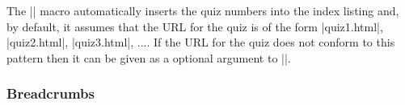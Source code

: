 \documentclass[svgnames]{article}
\begin{document}
  \begin{latexcode}
  \end{latexcode}

  \noindent The \LatexCode|\quiz| macro automatically inserts the quiz
  numbers into the index listing and, by default, it assumes that the
  URL for the quiz is of the form \BashCode|quiz1.html|,
  \BashCode|quiz2.html|, \BashCode|quiz3.html|, .... If the URL for the quiz
  does not conform to this pattern then it can be given as a optional
  argument to \LatexCode|\quiz|.

  \subsubsection{Breadcrumbs}\label{SS:breadcrumbs}
\end{document}
